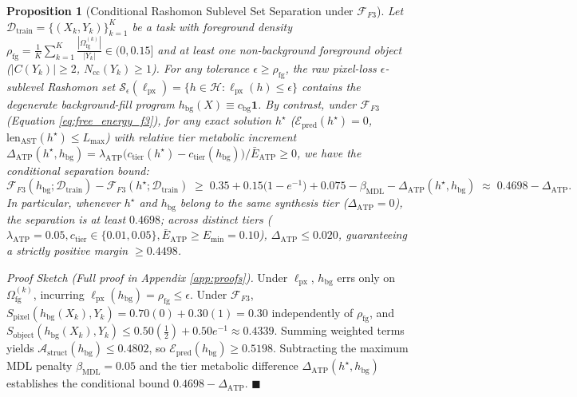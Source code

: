 \documentclass[10pt,a4paper]{article}
\newtheorem{proposition}{Proposition}
\begin{document}
\begin{proposition}[Conditional Rashomon Sublevel Set Separation under $\mathcal{F}_{F3}$]
\label{prop:rashomon}
Let $\mathcal{D}_{\text{train}} = \{(X_k, Y_k)\}_{k=1}^K$ be a task with foreground density $\rho_{\text{fg}} = \frac{1}{K}\sum_{k=1}^K \frac{|\Omega_{\text{fg}}^{(k)}|}{|Y_k|} \in (0, 0.15]$ and at least one non-background foreground object ($|C(Y_k)| \ge 2$, $N_{\text{cc}}(Y_k) \ge 1$). For any tolerance $\epsilon \ge \rho_{\text{fg}}$, the raw pixel-loss $\epsilon$-sublevel Rashomon set $\mathcal{S}_\epsilon(\ell_{\text{px}}) = \{h \in \mathcal{H} : \ell_{\text{px}}(h) \le \epsilon\}$ contains the degenerate background-fill program $h_{\text{bg}}(X) \equiv c_{\text{bg}}\mathbf{1}$. By contrast, under $\mathcal{F}_{F3}$ (Equation \ref{eq:free_energy_f3}), for any exact solution $h^\star$ ($\mathcal{E}_{\text{pred}}(h^\star) = 0$, $\text{len}_{\text{AST}}(h^\star) \le L_{\max}$) with relative tier metabolic increment $\Delta_{\text{ATP}}(h^\star, h_{\text{bg}}) = \lambda_{\text{ATP}}\big(c_{\text{tier}}(h^\star) - c_{\text{tier}}(h_{\text{bg}})\big)/\bar{E}_{\text{ATP}} \ge 0$, we have the conditional separation bound:
\begin{equation}
\mathcal{F}_{F3}(h_{\text{bg}}; \mathcal{D}_{\text{train}}) - \mathcal{F}_{F3}(h^\star; \mathcal{D}_{\text{train}}) \;\ge\; 0.35 + 0.15\big(1 - e^{-1}\big) + 0.075 - \beta_{\text{MDL}} - \Delta_{\text{ATP}}(h^\star, h_{\text{bg}}) \;\approx\; 0.4698 - \Delta_{\text{ATP}}.
\end{equation}
In particular, whenever $h^\star$ and $h_{\text{bg}}$ belong to the same synthesis tier ($\Delta_{\text{ATP}} = 0$), the separation is at least $0.4698$; across distinct tiers ($\lambda_{\text{ATP}}=0.05, c_{\text{tier}}\in\{0.01, 0.05\}, \bar{E}_{\text{ATP}} \ge E_{\min}=0.10$), $\Delta_{\text{ATP}} \le 0.020$, guaranteeing a strictly positive margin $\ge 0.4498$.
\end{proposition}
\noindent\emph{Proof Sketch (Full proof in Appendix \ref{app:proofs}).} Under $\ell_{\text{px}}$, $h_{\text{bg}}$ errs only on $\Omega_{\text{fg}}^{(k)}$, incurring $\ell_{\text{px}}(h_{\text{bg}}) = \rho_{\text{fg}} \le \epsilon$. Under $\mathcal{F}_{F3}$, $S_{\text{pixel}}(h_{\text{bg}}(X_k), Y_k) = 0.70(0) + 0.30(1) = 0.30$ independently of $\rho_{\text{fg}}$, and $S_{\text{object}}(h_{\text{bg}}(X_k), Y_k) \le 0.50(\frac{1}{2}) + 0.50 e^{-1} \approx 0.4339$. Summing weighted terms yields $\mathcal{A}_{\text{struct}}(h_{\text{bg}}) \le 0.4802$, so $\mathcal{E}_{\text{pred}}(h_{\text{bg}}) \ge 0.5198$. Subtracting the maximum MDL penalty $\beta_{\text{MDL}} = 0.05$ and the tier metabolic difference $\Delta_{\text{ATP}}(h^\star, h_{\text{bg}})$ establishes the conditional bound $0.4698 - \Delta_{\text{ATP}}$. $\blacksquare$
\end{document}
